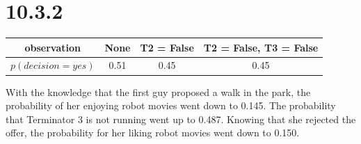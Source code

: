 \documentclass[a4paper,11pt]{article}
\theoremstyle{definition}
\theoremstyle{plain}
\theoremstyle{remark}
\begin{document}
\section*{10.3.2}
\begin{table}[H]
\centering
\begin{tabular}{|c|c|c|c|}
\hline
observation & None & T2 = False & T2 = False, T3 = False \\ \hline
$p(decision = yes)$ & 0.51 & 0.45 & 0.45 \\ \hline
\end{tabular}
\end{table}

With the knowledge that the first guy proposed a walk in the park, the probability of her enjoying robot movies went down to 0.145. The probability that Terminator 3 is not running went up to 0.487. Knowing that she rejected the offer, the probability for her liking robot movies went down to 0.150.
\end{document}
